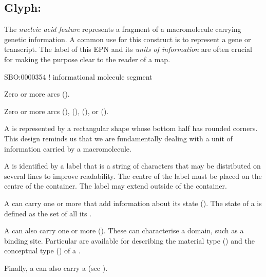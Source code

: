\subsection{Glyph: }
\label{sec:genetic}

The \emph{nucleic acid feature} represents a fragment of a macromolecule carrying genetic information.
A common use for this construct is to represent a gene or transcript.
The label of this EPN and its \emph{units of information} are often crucial for making the purpose clear to the reader of a map.

\begin{glyphDescription}

\glyphSboTerm
SBO:0000354 ! informational molecule segment

\glyphIncoming
Zero or more  arcs ().

\glyphOutgoing
Zero or more  arcs (),  (),  (), or  ().

\glyphContainer
A  is represented by a rectangular shape whose bottom half has rounded corners.
This design reminds us that we are fundamentally dealing with a unit of information carried by a macromolecule.

\glyphLabel
A  is identified by a label that is  a string of characters that may be distributed on several lines to improve readability.
The centre of the label must be placed on the centre of the container.
The label may extend outside of the container.

\glyphAux
A  can carry one or more  that add information about its state ().
The state of a  is defined as the set of all its .

A  can also carry one or more  ().
These can characterise a domain, such as a binding site.
Particular  are available for describing the material type () and the conceptual type () of a .

Finally, a  can also carry a  (see ).

\end{glyphDescription}

